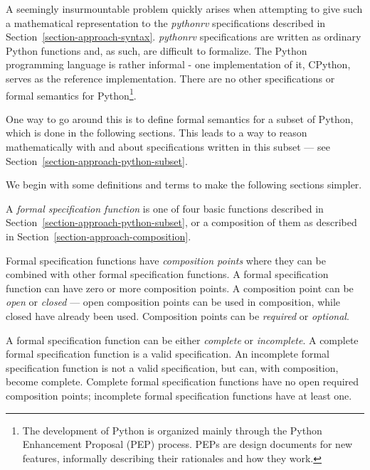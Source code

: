 A seemingly insurmountable problem quickly arises when attempting to give such
a mathematical representation to the \textit{pythonrv} specifications described
in Section~\ref{section-approach-syntax}. \textit{pythonrv} specifications are
written as ordinary Python functions and, as such, are difficult to formalize.
The Python programming language is rather informal - one implementation of it,
CPython, serves as the reference implementation. There are no other
specifications or formal semantics for Python\footnote{The development of
  Python is organized mainly through the Python Enhancement Proposal (PEP)
  process. PEPs are design documents for new features, informally describing
their rationales and how they work.}.

One way to go around this is to define formal semantics for a subset of Python,
which is done in the following sections. This leads to a way to reason
mathematically with and about specifications written in this subset --- see
Section~\ref{section-approach-python-subset}.


We begin with some definitions and terms to make the following sections
simpler. 

\begin{mydef}\label{def-}
A \textit{formal specification function} is one of four basic functions
described in Section~\ref{section-approach-python-subset}, or a composition of
them as described in Section~\ref{section-approach-composition}.
\end{mydef}

\begin{mydef}\label{def-}
Formal specification functions have \textit{composition points} where they can
be combined with other formal specification functions. A formal specification
function can have zero or more composition points. A composition point can be
\textit{open} or \textit{closed} --- open composition points can be used in
composition, while closed have already been used. Composition points can be
\textit{required} or \textit{optional}.
\end{mydef}

\begin{mydef}\label{def-}
A formal specification function can be either \textit{complete} or
\textit{incomplete}. A complete formal specification function is a valid
specification. An incomplete formal specification function is not a valid
specification, but can, with composition, become complete. Complete formal
specification functions have no open required composition points; incomplete
formal specification functions have at least one.
\end{mydef}

